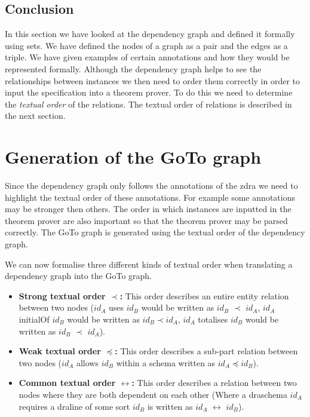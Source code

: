 \subsection{Conclusion}

In this section we have looked at the dependency graph and defined it formally using sets. We have defined the nodes of a graph as a pair and the edges as a triple. We have given examples of certain annotations and how they would be represented formally. Although the dependency graph helps to see the relationships between instances we then need to order them correctly in order to input the specification into a theorem prover. To do this we need to determine the \emph{textual order} of the relations. The textual order of relations is described in the next section.

\section{Generation of the GoTo graph}

Since the dependency graph only follows the annotations of the \gls{zdra} we need to highlight the textual order of these annotations. For example some annotations may be stronger then others. The order in which instances are inputted in the theorem prover are also important so that the theorem prover may be parsed correctly. The GoTo graph is generated using the textual order of the dependency graph.

\begin{defin}
We can now formalise three different kinds of textual order when translating a dependency graph into the GoTo graph.

\begin{itemize}
\item \textbf{Strong textual order $\prec$:} This order describes an entire entity relation between two nodes ($id_{A}$ uses $id_{B}$ would be written as $id_{B}$ $\prec$ $id_{A}$, $id_{A}$ initialOf $id_{B}$ would be written as $id_{B} \prec id_{A}$, $id_{A}$ totalises $id_{B}$ would be written as $id_{B}$ $\prec$ $id_{A}$).

\item \textbf{Weak textual order $\preceq$:} This order describes a sub-part relation between two nodes ($id_{A}$ allows $id_{B}$ within a schema written as $id_{A} \preceq id_{B}$).

\item \textbf{Common textual order $\leftrightarrow$:} This order describes a relation between two nodes where they are both dependent on each other (Where a draschema $id_{A}$ requires a draline of some sort $id_{B}$ is written as $id_{A}$ $\leftrightarrow$ $id_{B}$).
\end{itemize}
\end{defin}

